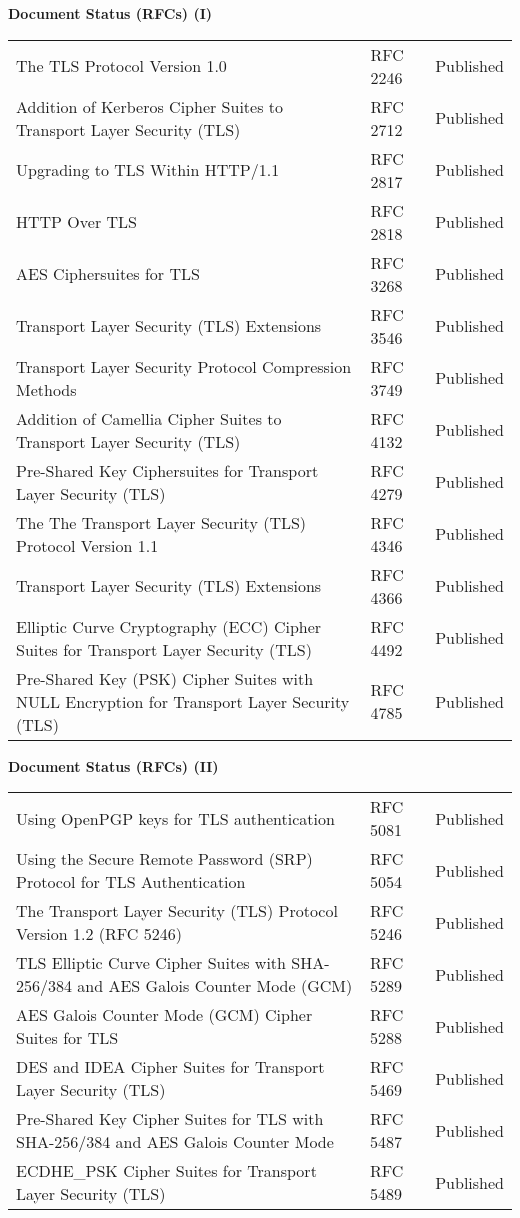 \documentclass[helvetica]{seminar}
\newcommand{\heading}[1]{%
  \begin{center} 
    \large\bf 
    #1 
  \end{center} 
  \vspace{.4 in}}
\begin{document}
\begin{slide}
\heading{Document Status (RFCs) (I)}

{\tiny
\begin{tabular}{|p{1.5 in}|p{1.4 in}|p{.7 in}|}
\hline
The TLS Protocol Version 1.0  & RFC 2246 & Published \\
Addition of Kerberos Cipher Suites to Transport Layer Security (TLS)  & RFC 2712 & Published \\
Upgrading to TLS Within HTTP/1.1  & RFC 2817 & Published \\
HTTP Over TLS  & RFC 2818 & Published \\
AES Ciphersuites for TLS  & RFC 3268 & Published \\
Transport Layer Security (TLS) Extensions  & RFC 3546 & Published \\
Transport Layer Security Protocol Compression Methods  & RFC 3749 & Published \\
Addition of Camellia Cipher Suites to Transport Layer Security (TLS)  & RFC 4132 & Published \\
Pre-Shared Key Ciphersuites for Transport Layer Security (TLS)  & RFC 4279 & Published \\
The The Transport Layer Security (TLS) Protocol Version 1.1  & RFC 4346 & Published \\
Transport Layer Security (TLS) Extensions  & RFC 4366 & Published \\
Elliptic Curve Cryptography (ECC) Cipher Suites for Transport Layer Security (TLS)  & RFC 4492 & Published \\
Pre-Shared Key (PSK) Cipher Suites with NULL Encryption for Transport Layer Security (TLS)  & RFC 4785 & Published \\
\hline
\end{tabular}
}
\end{slide}

\begin{slide}
\heading{Document Status (RFCs) (II)}

{\tiny
\begin{tabular}{|p{1.5 in}|p{1.4 in}|p{.7 in}|}
\hline
Using OpenPGP keys for TLS authentication  & RFC 5081 & Published \\
Using the Secure Remote Password (SRP) Protocol for TLS Authentication  & RFC 5054 & Published \\
The Transport Layer Security (TLS) Protocol Version 1.2 (RFC 5246) & RFC 5246 & Published \\
TLS Elliptic Curve Cipher Suites with SHA-256/384 and AES Galois Counter Mode (GCM) & RFC 5289 & Published \\
AES Galois Counter Mode (GCM) Cipher Suites for TLS & RFC 5288 & Published \\
DES and IDEA Cipher Suites for Transport Layer Security (TLS) & RFC 5469 & Published \\
Pre-Shared Key Cipher Suites for TLS with SHA-256/384 and AES Galois Counter Mode & RFC 5487 & Published \\
ECDHE\_PSK Cipher Suites for Transport Layer Security (TLS) & RFC 5489 & Published \\
\hline
\end{tabular}
}
\end{slide}
\end{document}
